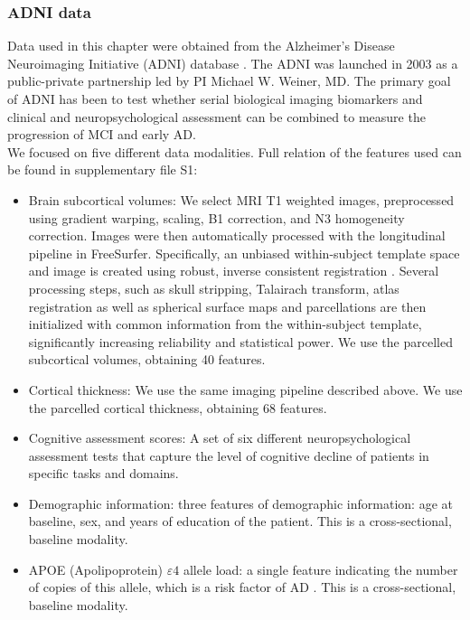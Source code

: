 \subsubsection{ADNI data}

Data used in this chapter were obtained from the Alzheimer’s Disease Neuroimaging Initiative (ADNI) database \cite{Mueller2005}. The ADNI was launched in 2003 as a public-private partnership led by PI Michael W. Weiner, MD. The primary goal of ADNI has been to test whether serial biological imaging biomarkers and clinical and neuropsychological assessment can be combined to measure the progression of MCI and early AD. \\

We focused on five different data modalities. Full relation of the features used can be found in supplementary file S1: 

\begin{itemize}
    \item Brain subcortical volumes: We select MRI T1 weighted images, preprocessed using gradient warping, scaling, B1 correction, and N3 homogeneity correction. Images were then automatically processed with the longitudinal pipeline \cite{Reuter2012} in FreeSurfer. Specifically, an unbiased within-subject template space and image is created using robust, inverse consistent registration \cite{Reuter2010}. Several processing steps, such as skull stripping, Talairach transform, atlas registration as well as spherical surface maps and parcellations are then initialized with common information from the within-subject template, significantly increasing reliability and statistical power. We use the parcelled subcortical volumes, obtaining 40 features.
    \item Cortical thickness: We use the same imaging pipeline described above. We use the parcelled cortical thickness, obtaining 68 features.
    \item Cognitive assessment scores: A set of six different neuropsychological assessment tests that capture the level of cognitive decline of patients in specific tasks and domains. 
    \item Demographic information: three features of demographic information: age at baseline, sex, and years of education of the patient. This is a cross-sectional, baseline modality.
    \item APOE (Apolipoprotein) $\varepsilon4$ allele load: a single feature indicating the number of copies of this allele, which is a risk factor of AD \cite{Saunders1993}. This is a cross-sectional, baseline modality.
\end{itemize}

